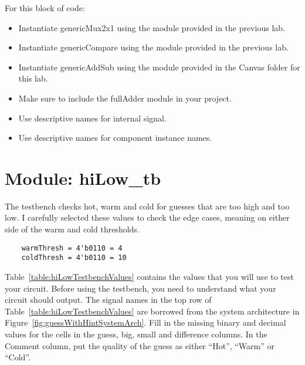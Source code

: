 For this block of code:

\begin{itemize}
\item
  Instantiate genericMux2x1 using the module provided in the previous
  lab.
\item
  Instantiate genericCompare using the module provided in the previous
  lab.
\item
  Instantiate genericAddSub using the module provided in the Canvas
  folder for this lab.
\item
  Make sure to include the fullAdder module in your project.
\item
  Use descriptive names for internal signal.
\item
  Use descriptive names for component instance names.
\end{itemize}

\section{Module: hiLow\_tb}

The testbench checks hot, warm and cold for guesses that
are too high and too low. I carefully selected these values to check the
edge cases, meaning on either side of the warm and cold thresholds.
\begin{verbatim}
	warmThresh = 4'b0110 = 4
	coldThresh = 4'b0110 = 10
\end{verbatim}

Table~\ref{table:hiLowTestbenchValues} contains the values that you will use to test your circuit.
Before using the testbench, you need to understand what your circuit
should output. The signal names in the top row of Table~\ref{table:hiLowTestbenchValues} are borrowed
from the system architecture in Figure~\ref{fig:guessWithHintSystemArch}. Fill in the missing binary and
decimal values for the cells in the guess, big, small and difference
columns. In the Comment column, put the quality of the guess as either
``Hot'', ``Warm'' or ``Cold''.

